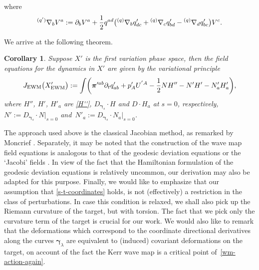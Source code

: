 \documentclass[pdftex]{sigma}
\def\ptl{\partial}%
\def\mbo#1{\boldsymbol{#1}}%
\def\grad{{\nabla}}%
\newcommand{\leftexp}[2]{{\vphantom{#2}}^{#1}{#2}}
\def\halb{\frac{1}{2}}%
\numberwithin{equation}{section}
\newtheorem{Corollary}[Theorem]{Corollary}
\begin{document}
where
\[
\leftexp{(q')}{\grad}_b V^a := \ptl_b V^a+ \halb q^{ad} \bigl(\leftexp{(q)}{\grad}_b q'_{dc} + \leftexp{(q)}{\grad}_c q'_{bd} -\leftexp{(q)}{\grad}_d q'_{bc} \bigr) V^c.
\]

We arrive at the following theorem.

\begin{Corollary}\label{second-var}
Suppose $X'$ is the first variation phase space, then the field equations for the dynamics in $X'$ are given by the variational principle
\begin{align*}
J_{{\rm EWM}} \bigl(X'_{{\rm EWM}}\bigr) := \int \biggl(\mbo{\pi}'^{ab} \ptl_t q'_{ab} + p'_A U^{'A} - \halb N H'' - N' H' - N'_a H'_a \biggr),
\end{align*}
where $H''$, $H'$, $H'_a$ are \eqref{H''}, $D_{\mbo{\gamma}_s} \cdot H$ and $D \cdot H_a$ at $s=0$, respectively, $N' := D_{\mbo{\gamma}_s} \cdot N \big\vert_{s=0}$ and~${N'_a := D_{\mbo{\gamma}_s} \cdot N_a \big\vert_{s=0}}$.
\end{Corollary}

The approach used above is the classical Jacobian method, as remarked by Moncrief \cite{Moncrief_74}. Separately, it may be noted that the construction of the wave map field equations is analogous to that of the geodesic deviation equations or the `Jacobi' fields \cite{Misn_78, synge_34}. In view of the fact that the Hamiltonian formulation of the geodesic deviation equations is relatively uncommon, our derivation may also be adapted for this purpose. Finally, we would like to emphasize that our assumption that \eqref{s-t-coordinates} holds, is not (effectively) a restriction in the class of perturbations. In case this condition is relaxed, we shall also pick up the Riemann curvature of the target, but with torsion. The fact that we pick only the curvature term of the target is crucial for our work. We would also like to remark that the deformations which correspond to the coordinate directional derivatives along the curves $\mbo{\gamma}_\lambda$ are equivalent to (induced) covariant deformations on the target, on account of the fact the Kerr wave map is a critical point of~\eqref{wm-action-again}.
\end{document}
